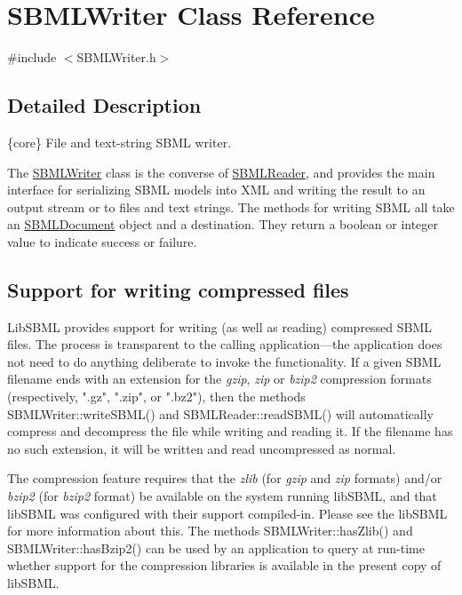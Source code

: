 \hypertarget{class_s_b_m_l_writer}{}\section{S\+B\+M\+L\+Writer Class Reference}
\label{class_s_b_m_l_writer}


{\ttfamily \#include $<$S\+B\+M\+L\+Writer.\+h$>$}



\subsection{Detailed Description}
\{core\} File and text-\/string S\+B\+ML writer.



The \hyperlink{class_s_b_m_l_writer}{S\+B\+M\+L\+Writer} class is the converse of \hyperlink{class_s_b_m_l_reader}{S\+B\+M\+L\+Reader}, and provides the main interface for serializing S\+B\+ML models into X\+ML and writing the result to an output stream or to files and text strings. The methods for writing S\+B\+ML all take an \hyperlink{class_s_b_m_l_document}{S\+B\+M\+L\+Document} object and a destination. They return a boolean or integer value to indicate success or failure.\hypertarget{class_s_b_m_l_writer_sbmlwriter-compression}{}\subsection{Support for writing compressed files}\label{class_s_b_m_l_writer_sbmlwriter-compression}
Lib\+S\+B\+ML provides support for writing (as well as reading) compressed S\+B\+ML files. The process is transparent to the calling application---the application does not need to do anything deliberate to invoke the functionality. If a given S\+B\+ML filename ends with an extension for the {\itshape gzip}, {\itshape zip} or {\itshape bzip2} compression formats (respectively, {\ttfamily ".gz"}, {\ttfamily ".zip"}, or {\ttfamily ".bz2"}), then the methods S\+B\+M\+L\+Writer\+::write\+S\+B\+M\+L() and S\+B\+M\+L\+Reader\+::read\+S\+B\+M\+L() will automatically compress and decompress the file while writing and reading it. If the filename has no such extension, it will be written and read uncompressed as normal.

The compression feature requires that the {\itshape zlib} (for {\itshape gzip} and {\itshape zip} formats) and/or {\itshape bzip2} (for {\itshape bzip2} format) be available on the system running lib\+S\+B\+ML, and that lib\+S\+B\+ML was configured with their support compiled-\/in. Please see the lib\+S\+B\+ML for more information about this. The methods S\+B\+M\+L\+Writer\+::has\+Zlib() and S\+B\+M\+L\+Writer\+::has\+Bzip2() can be used by an application to query at run-\/time whether support for the compression libraries is available in the present copy of lib\+S\+B\+ML.

